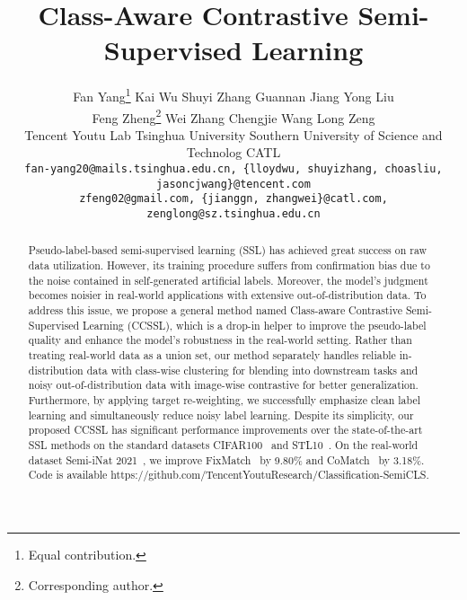 \documentclass[10pt,twocolumn,letterpaper]{article}
\begin{document}
\title{Class-Aware Contrastive Semi-Supervised Learning}

\renewcommand{\thempfootnote}{\arabic{mpfootnote}}
\author{Fan Yang\thanks{Equal contribution.} \hspace{0.3cm} 
Kai Wu\footnotemark[\value{footnote}] \hspace{0.3cm} 
Shuyi Zhang \hspace{0.3cm} 
Guannan Jiang \hspace{0.3cm}
Yong Liu \hspace{0.3cm} \\
Feng Zheng\thanks{Corresponding author.} \hspace{0.3cm}
Wei Zhang \hspace{0.3cm}
Chengjie Wang\footnotemark[\value{footnote}] \hspace{0.3cm}
Long Zeng\\
Tencent Youtu Lab \hspace{0.3cm} Tsinghua University \hspace{0.3cm} Southern University of Science and Technolog \hspace{0.3cm} CATL\\
{\tt\small fan-yang20@mails.tsinghua.edu.cn, \{lloydwu, shuyizhang, choasliu, jasoncjwang\}@tencent.com} \\
{\tt\small zfeng02@gmail.com, \{jianggn, zhangwei\}@catl.com, zenglong@sz.tsinghua.edu.cn}
}
\maketitle

\begin{abstract}
Pseudo-label-based semi-supervised learning (SSL) has achieved great success on raw data utilization. However, its training procedure suffers from confirmation bias due to the noise contained in self-generated artificial labels. Moreover, the model's judgment becomes noisier in real-world applications with extensive out-of-distribution data. To address this issue, we propose a general method named Class-aware Contrastive Semi-Supervised Learning (CCSSL), which is a drop-in helper to improve the pseudo-label quality and enhance the model's robustness in the real-world setting. Rather than treating real-world data as a union set, our method separately handles reliable in-distribution data with class-wise clustering for blending into downstream tasks and noisy out-of-distribution data with image-wise contrastive for better generalization. Furthermore, by applying target re-weighting, we successfully emphasize clean label learning and simultaneously reduce noisy label learning. Despite its simplicity, our proposed CCSSL has significant performance improvements over the state-of-the-art SSL methods on the standard datasets CIFAR100~\cite{krizhevsky2009learning} and STL10~\cite{coates2011analysis}. On the real-world dataset Semi-iNat 2021~\cite{su2021semi_iNat}, we improve FixMatch~\cite{sohn2020fixmatch} by 9.80\% and CoMatch~\cite{li2021comatch} by 3.18\%. Code is available  https://github.com/TencentYoutuResearch/Classification-SemiCLS.

\end{abstract}
\end{document}
